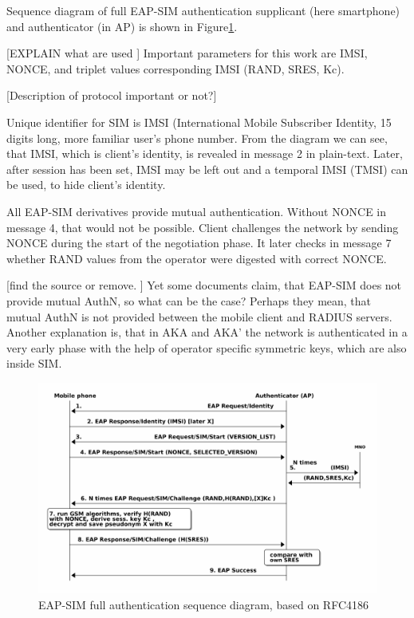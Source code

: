 \documentclass[12pt,a4paper,english]{tutthesis}
\begin{document}
Sequence diagram of full EAP-SIM authentication supplicant (here
smartphone) and authenticator (in AP) is shown in
Figure\ref{fig:eap-sim-full}. 

[EXPLAIN what are used ]
Important parameters for this work are IMSI, NONCE, and triplet values
corresponding IMSI (RAND, SRES, Kc).

[Description of protocol important or not?]

Unique identifier for SIM is IMSI (International Mobile Subscriber
Identity, 15 digits long, more familiar user's phone number.
From the diagram we can see, that IMSI, which is client's identity, is
revealed in message 2 in plain-text. Later, after session has been
set, IMSI may be left out and a temporal IMSI (TMSI) can be used,
to hide client's identity.

All EAP-SIM derivatives provide mutual authentication. Without NONCE
in message 4, that would not be possible. 
 Client challenges the network by
sending NONCE during the start of the negotiation phase. It later checks in
message 7 whether RAND values from the operator were digested with correct NONCE.

[find the source or remove. ] 
Yet some documents claim, that EAP-SIM does not provide mutual AuthN, so what
can be the case? Perhaps they mean, that mutual AuthN is not provided between
the mobile client  and RADIUS servers. Another explanation is, that in AKA
and AKA' the network is authenticated in a very early phase with the
help of operator specific symmetric keys, which are also inside SIM.





\begin{figure}[htb]
\centering
\includegraphics[width=.9\linewidth]{eap-sim-full.png}
\caption{\label{fig:eap-sim-full}EAP-SIM full authentication sequence diagram, based on RFC4186}
\end{figure}
\end{document}
